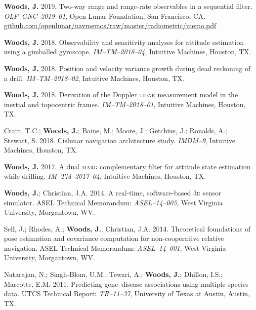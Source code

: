 \documentclass[12pt,letterpaper]{article}
\begin{document}
{\medskip
\par\textbf{Woods, J.} 2019. Two-way range and range-rate observables in a sequential filter. \textit{OLF--GNC--2019--01}, Open Lunar Foundation, San Francisco, CA. \href{https://github.com/openlunar/navmemos/raw/master/radiometric/memo.pdf}{github.com/openlunar/navmemos/raw/master/radiometric/memo.pdf}

\medskip
\par\textbf{Woods, J.} 2018. Observability and sensitivity analyses for attitude estimation using a gimballed gyroscope. \textit{IM--TM--2018--04}, Intuitive Machines, Houston, TX.

\medskip
\par \textbf{Woods, J.} 2018. Position and velocity variance growth during dead reckoning of a drill. \textit{IM--TM--2018--02}, Intuitive Machines, Houston, TX.

\medskip
\par \textbf{Woods, J.} 2018. Derivation of the Doppler \textsc{lidar} measurement model in the inertial and topocentric frames. \textit{IM--TM--2018--01}, Intuitive Machines, Houston, TX.

\medskip
\par Crain, T.C.; \textbf{Woods, J.}; Baine, M.; Moore, J.; Getchius, J.; Ronalds, A.; Stewart, S. 2018. Cislunar navigation architecture study. \textit{IMDM--9}, Intuitive Machines, Houston, TX.

\medskip
\par \textbf{Woods, J.} 2017. A dual \textsc{marg} complementary filter for attitude state estimation while drilling. \textit{IM--TM--2017--04}, Intuitive Machines, Houston, TX.

\medskip
\par \textbf{Woods, J.}; Christian, J.A. 2014. A real-time, software-based \textsc{3d} sensor simulator. ASEL Technical Memorandum: \textit{ASEL--14--005}, West Virginia University, Morgantown, WV.

\medskip
\par Sell, J.; Rhodes, A.; \textbf{Woods, J.}; Christian, J.A. 2014. Theoretical foundations of pose estimation and covariance computation for non-cooperative relative navigation. ASEL Technical Memorandum: \textit{ASEL--14--001}, West Virginia University, Morgantown, WV.

\medskip
\par Natarajan, N.; Singh-Blom, U.M.; Tewari, A.; \textbf{Woods, J.}; Dhillon, I.S.; Marcotte, E.M. 2011. Predicting gene--disease associations using multiple species data. UTCS Technical Report: \textit{TR--11--37}, University of Texas at Austin, Austin, TX.

}
\end{document}
